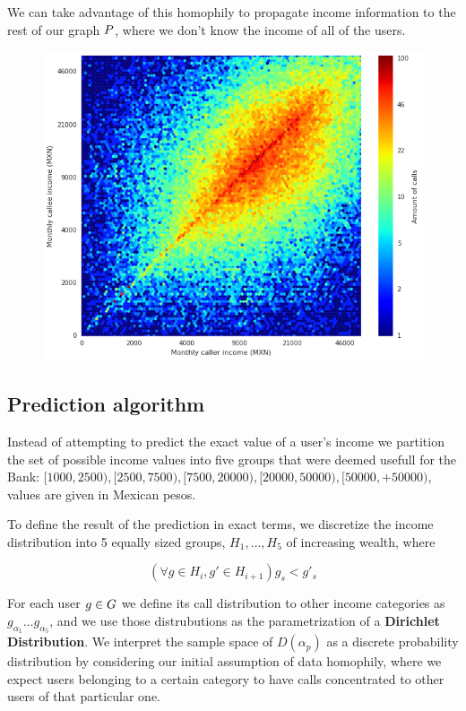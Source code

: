We can take advantage of this homophily to propagate income information to the rest of our graph $ \mathlarger{P} $, where we don't know the income of all of the users.

\begin{figure}[h]
\begin{center}
\includegraphics[width=1\columnwidth]{figures/Homophily_income_origin_target_1/Homophily_income_origin_target_1.png}
\caption{ \protect}
\label{homophily_heatmap}
\end{center}
\end{figure}

\subsection{Prediction algorithm}

Instead of attempting to predict the exact value of a user's income we partition the set of possible income values into five groups that were deemed usefull for the Bank: $[1000,2500),[2500,7500),[7500,20000),[20000,50000),[50000,+50000)$, values are given in Mexican pesos.  

To define the result of the prediction in exact terms, we discretize the income distribution into 5 equally sized groups, $ H_1, \ldots, H_5 $ of increasing wealth, where

\[
\left( \forall g \in H_i, g' \in H_{i + 1} \right) g_s < g'_s
\]

For each user $ g \in \mathlarger{G} $ we define its call distribution to other income categories as $ g_{\alpha_1} \ldots g_{\alpha_5} $, and we use those distrubutions as the parametrization of a \textbf{Dirichlet Distribution}. We interpret the sample space of $ D(\alpha_p) $ as a discrete probability distribution by considering our initial assumption of data homophily, where we expect users belonging to a certain category to have calls concentrated to other users of that particular one.

